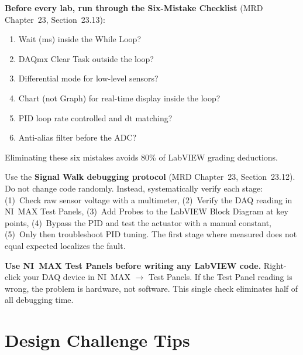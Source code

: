 \documentclass[11pt,letterpaper]{article}
\begin{document}
\begin{protip}
\textbf{Before every lab, run through the Six-Mistake Checklist} (MRD Chapter~23, Section~23.13):
\begin{enumerate}[nosep,leftmargin=*]
\item Wait (ms) inside the While Loop?
\item DAQmx Clear Task outside the loop?
\item Differential mode for low-level sensors?
\item Chart (not Graph) for real-time display inside the loop?
\item PID loop rate controlled and dt matching?
\item Anti-alias filter before the ADC?
\end{enumerate}
Eliminating these six mistakes avoids 80\% of LabVIEW grading deductions.
\end{protip}

\begin{faqbox}
Use the \textbf{Signal Walk debugging protocol} (MRD Chapter~23, Section~23.12). Do not change code randomly. Instead, systematically verify each stage: (1)~Check raw sensor voltage with a multimeter, (2)~Verify the DAQ reading in NI~MAX Test Panels, (3)~Add Probes to the LabVIEW Block Diagram at key points, (4)~Bypass the PID and test the actuator with a manual constant, (5)~Only then troubleshoot PID tuning. The first stage where measured does not equal expected localizes the fault.
\end{faqbox}

\begin{tipbox}
\textbf{Use NI~MAX Test Panels before writing any LabVIEW code.} Right-click your DAQ device in NI~MAX $\to$ Test Panels. If the Test Panel reading is wrong, the problem is hardware, not software. This single check eliminates half of all debugging time.
\end{tipbox}

\section{Design Challenge Tips}
\end{document}
